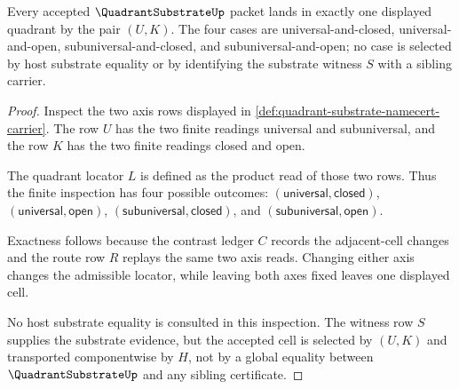 \begin{theorem}
\label{thm:quadrant-substrate-axis-classifier-totality}
Every accepted $\QuadrantSubstrateUp$ packet lands in exactly one displayed quadrant by the pair $(U,K)$. The four cases are universal-and-closed, universal-and-open, subuniversal-and-closed, and subuniversal-and-open; no case is selected by host substrate equality or by identifying the substrate witness $S$ with a sibling carrier.
\end{theorem}
\begin{proof}
Inspect the two axis rows displayed in \autoref{def:quadrant-substrate-namecert-carrier}. The row $U$ has the two finite readings universal and subuniversal, and the row $K$ has the two finite readings closed and open.

The quadrant locator $L$ is defined as the product read of those two rows. Thus the finite inspection has four possible outcomes: $(\mathsf{universal},\mathsf{closed})$, $(\mathsf{universal},\mathsf{open})$, $(\mathsf{subuniversal},\mathsf{closed})$, and $(\mathsf{subuniversal},\mathsf{open})$.

Exactness follows because the contrast ledger $C$ records the adjacent-cell changes and the route row $R$ replays the same two axis reads. Changing either axis changes the admissible locator, while leaving both axes fixed leaves one displayed cell.

No host substrate equality is consulted in this inspection. The witness row $S$ supplies the substrate evidence, but the accepted cell is selected by $(U,K)$ and transported componentwise by $H$, not by a global equality between $\QuadrantSubstrateUp$ and any sibling certificate.
\end{proof}

